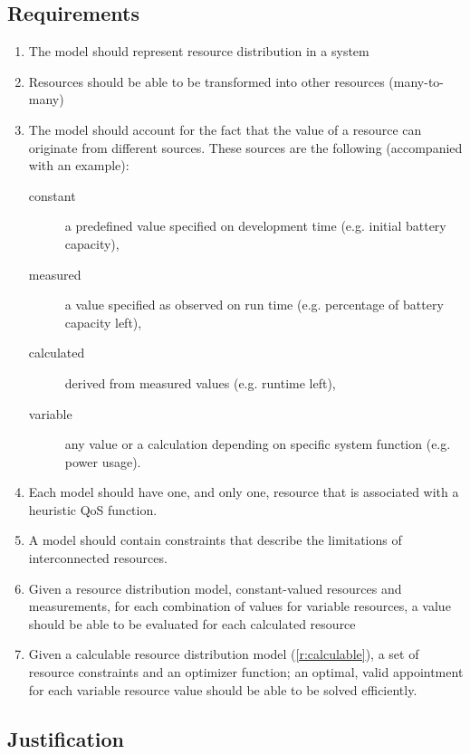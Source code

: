 \subsection{Requirements}
\begin{enumerate}[label=R\rdmid .\arabic*]
\item \label{r:main} The model should represent resource distribution in a system
\item \label{r:transform} Resources should be able to be transformed into other resources (many-to-many)
\item \label{r:resource_types} The model should account for the fact that the value of a resource can originate from different sources. These sources are the following (accompanied with an example):
\begin{description}
\item[constant] a predefined value specified on development time (e.g. initial battery capacity),
\item[measured] a value specified as observed on run time (e.g. percentage of battery capacity left),
\item[calculated] derived from measured values (e.g. runtime left),
\item[variable] any value or a calculation depending on specific system function (e.g. power usage).
\end{description}
\item \label{r:optimizer} Each model should have one, and only one, resource that is associated with a heuristic QoS function.
\item \label{r:constraint} A model should contain constraints that describe the limitations of interconnected resources.
\item \label{r:calculable}Given a resource distribution model, constant-valued resources and measurements, for each combination of values for variable resources, a value should be able to be evaluated for each calculated resource
\item \label{r:solvable} Given a calculable  resource distribution model (\ref{r:calculable}), a set of resource constraints and an optimizer function; an optimal, valid appointment for each variable resource value should be able to be solved efficiently.
\end{enumerate}

\subsection{Justification}

